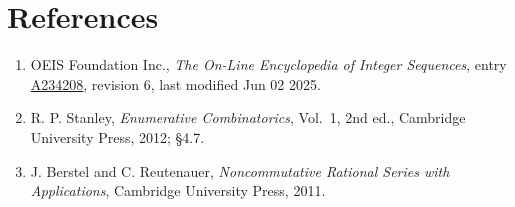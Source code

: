 \documentclass[11pt]{article}
\theoremstyle{definition}
\begin{document}
\section{References}

\begin{enumerate}

\item OEIS Foundation Inc., \emph{The On-Line Encyclopedia of Integer Sequences}, entry \href{https://oeis.org/A234208}{A234208}, revision 6, last modified Jun 02 2025.

\item R. P. Stanley, \emph{Enumerative Combinatorics}, Vol.~1, 2nd ed., Cambridge University Press, 2012; \S4.7.

\item J. Berstel and C. Reutenauer, \emph{Noncommutative Rational Series with Applications}, Cambridge University Press, 2011.

\end{enumerate}
\end{document}

